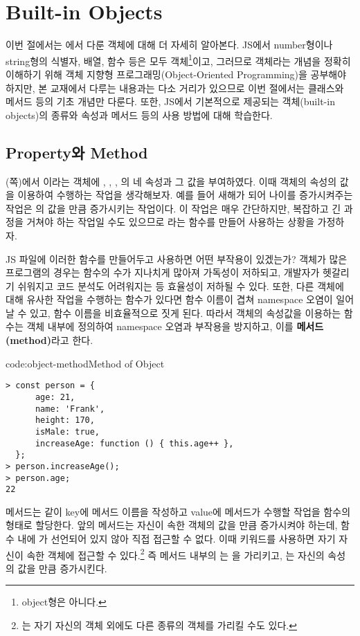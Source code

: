 \section{Built-in Objects} \label{sect:built-in-objects}

이번 절에서는 에서 다룬 객체에 대해 더 자세히 알아본다. JS에서 number형이나 string형의 식별자, 배열, 함수 등은 모두 객체\footnote{object형은 아니다.}이고, 그러므로 객체라는 개념을 정확히 이해하기 위해 객체 지향형 프로그래밍(Object-Oriented Programming)을 공부해야 하지만, 본 교재에서 다루는 내용과는 다소 거리가 있으므로 이번 절에서는 클래스와 메서드 등의 기초 개념만 다룬다. 또한, JS에서 기본적으로 제공되는 객체(built-in objects)의 종류와 속성과 메서드 등의 사용 방법에 대해 학습한다.

\subsection*{Property와 Method}

(\pageref{code:object-type}쪽)에서 이라는 객체에 , , , 의 네 속성과 그 값을 부여하였다. 이때  객체의 속성의 값을 이용하여 수행하는 작업을 생각해보자. 예를 들어 새해가 되어 나이를 증가시켜주는 작업은 의 값을 만큼 증가시키는 작업이다. 이 작업은 매우 간단하지만, 복잡하고 긴 과정을 거쳐야 하는 작업일 수도 있으므로 라는 함수를 만들어 사용하는 상황을 가정하자.

JS 파일에 이러한 함수를 만들어두고 사용하면 어떤 부작용이 있겠는가? 객체가 많은 프로그램의 경우는 함수의 수가 지나치게 많아져 가독성이 저하되고, 개발자가 헷갈리기 쉬워지고 코드 분석도 어려워지는 등 효율성이 저하될 수 있다. 또한, 다른 객체에 대해 유사한 작업을 수행하는 함수가 있다면 함수 이름이 겹쳐 namespace 오염이 일어날 수 있고, 함수 이름을 비효율적으로 짓게 된다. 따라서 객체의 속성값을 이용하는 함수는 객체 내부에 정의하여 namespace 오염과 부작용을 방지하고, 이를 \textbf{메서드(method)}라고 한다.

\begin{codeenv}{code:object-method}{Method of Object}\begin{verbatim}
> const person = {
      age: 21,
      name: 'Frank',
      height: 170,
      isMale: true,
      increaseAge: function () { this.age++ },
  };
> person.increaseAge();
> person.age;
22
\end{verbatim}
\end{codeenv}

메서드는 \와 같이 key에 메서드 이름을 작성하고 value에 메서드가 수행할 작업을 함수의 형태로 할당한다. 앞의  메서드는 자신이 속한  객체의  값을 만큼 증가시켜야 하는데, 함수 내에 가 선언되어 있지 않아 직접 접근할 수 없다. 이때  키워드를 사용하면 자기 자신이 속한 객체에 접근할 수 있다.\footnote{는 자기 자신의 객체 외에도 다른 종류의 객체를 가리킬 수도 있다.} 즉  메서드 내부의 는 을 가리키고, 는 자신의 속성 의 값을 만큼 증가시킨다.

